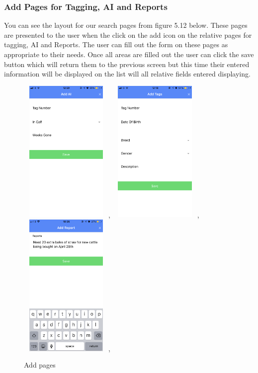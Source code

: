 \documentclass[12pt,a4paper,oneside,openany]{book}
\begin{document}
\subsubsection{Add Pages for Tagging, AI and Reports}
You can see the layout for our search pages from figure 5.12 below. These pages are presented to the user when the click on the add icon on the relative pages for tagging, AI and Reports. The user can fill out the form on these pages as appropriate to their needs. Once all areas are filled out the user can click the save button which will return them to the previous screen but this time their entered information will be displayed on the list will all relative fields entered displaying. 

\begin{figure}[ht]
\renewcommand\thefigure{5.16}
\centering
\includegraphics[width=4.5cm,height=7cm]{Images/addAI.png},
\includegraphics[width=4.5cm,height=7cm]{Images/addTags.png},
\includegraphics[width=4.5cm,height=7cm]{Images/addReport.png},
\caption{Add pages}
\label{add}
\end{figure}
\end{document}
